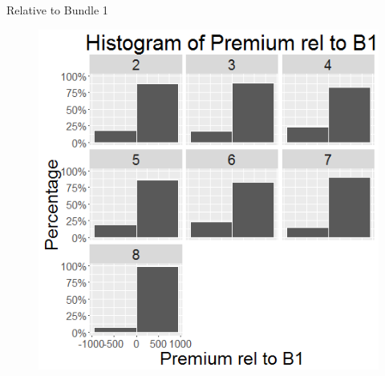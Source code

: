 \documentclass[xcolor=dvipsnames,12pt]{beamer}
\theoremstyle{definition}
\begin{document}
\begin{frame}{Relative to Bundle 1}
\begin{figure}

\graphicspath{ {../../1_relative_to_bundle_1/} }
\includegraphics[scale=0.43]{3_z_histogram_of_prem_rel_to_bundle_1_2_col_in_different_bundle_index}
\end{figure}
\end{frame}
\end{document}

